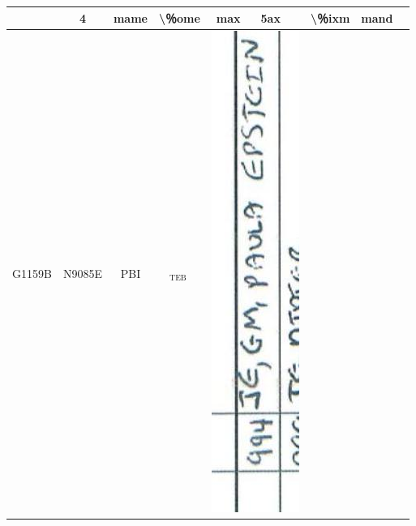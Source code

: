 \documentclass[10pt]{article}
\begin{document}
\begin{center}
\begin{tabular}{|c|c|c|c|c|c|c|c|c|c|}
 & 4 & mame & \textbackslash ％ome & max & 5ax &  & \textbackslash ％ixm & mand &  \\
\hline
G1159B & N9085E & PBI & \({ }_{\text {TEB }}\) & \multicolumn{3}{|l|}{\includegraphics[max width=\textwidth]{2025_02_27_dd68c3d38de88f0516d9g-053(5)}
}
\end{tabular}
\end{center}
\end{document}
